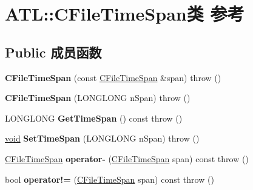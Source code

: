 \hypertarget{class_a_t_l_1_1_c_file_time_span}{}\section{A\+TL\+:\+:C\+File\+Time\+Span类 参考}
\label{class_a_t_l_1_1_c_file_time_span}
\subsection*{Public 成员函数}
\begin{DoxyCompactItemize}
\item 
\mbox{\label{class_a_t_l_1_1_c_file_time_span_a5dcf4ddde34d9a377ffe2771641d40e2}} 
{\bfseries C\+File\+Time\+Span} (const \hyperlink{class_a_t_l_1_1_c_file_time_span}{C\+File\+Time\+Span} \&span)  throw ()
\item 
\mbox{\label{class_a_t_l_1_1_c_file_time_span_af66f16393f5fd414553fbeebdd115c01}} 
{\bfseries C\+File\+Time\+Span} (L\+O\+N\+G\+L\+O\+NG n\+Span)  throw ()
\item 
\mbox{\label{class_a_t_l_1_1_c_file_time_span_af134e19d73d6ff5a420e5dee2a750348}} 
L\+O\+N\+G\+L\+O\+NG {\bfseries Get\+Time\+Span} () const  throw ()
\item 
\mbox{\label{class_a_t_l_1_1_c_file_time_span_ab6b0ce171d4629aea440fe5679092060}} 
\hyperlink{interfacevoid}{void} {\bfseries Set\+Time\+Span} (L\+O\+N\+G\+L\+O\+NG n\+Span)  throw ()
\item 
\mbox{\label{class_a_t_l_1_1_c_file_time_span_a8a318495b49adc5856501ead0a2a478e}} 
\hyperlink{class_a_t_l_1_1_c_file_time_span}{C\+File\+Time\+Span} {\bfseries operator-\/} (\hyperlink{class_a_t_l_1_1_c_file_time_span}{C\+File\+Time\+Span} span) const  throw ()
\item 
\mbox{\label{class_a_t_l_1_1_c_file_time_span_aa6d03ac6bc08c2b4913bd6edc13b346b}} 
bool {\bfseries operator!=} (\hyperlink{class_a_t_l_1_1_c_file_time_span}{C\+File\+Time\+Span} span) const  throw ()
\item 
\mbox{\label{class_a_t_l_1_1_c_file_time_span_ac909ce3a49334176abae28ab5600ac87}} 

\end{DoxyCompactItemize}
